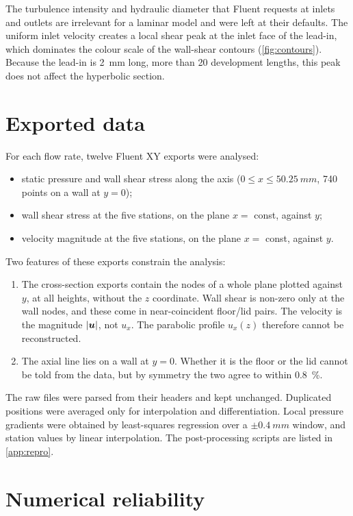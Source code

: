 The turbulence intensity and hydraulic diameter that Fluent requests at inlets and outlets are irrelevant for a laminar model and were left at their defaults. The uniform inlet velocity creates a local shear peak at the inlet face of the lead-in, which dominates the colour scale of the wall-shear contours (\cref{fig:contours}). Because the lead-in is \SI{2}{mm} long, more than 20 development lengths, this peak does not affect the hyperbolic section.

\section{Exported data}
\label{sec:num_exports}

For each flow rate, twelve Fluent XY exports were analysed:
\begin{itemize}
\item static pressure and wall shear stress along the axis ($0\le x\le\SI{50.25}{mm}$, 740 points on a wall at $y=0$);
\item wall shear stress at the five stations, on the plane $x=$ const, against $y$;
\item velocity magnitude at the five stations, on the plane $x=$ const, against $y$.
\end{itemize}
Two features of these exports constrain the analysis:
\begin{enumerate}
\item The cross-section exports contain the nodes of a whole plane plotted against $y$, at all heights, without the $z$ coordinate. Wall shear is non-zero only at the wall nodes, and these come in near-coincident floor/lid pairs. The velocity is the magnitude $|\bm{u}|$, not $u_x$. The parabolic profile $u_x(z)$ therefore cannot be reconstructed.
\item The axial line lies on a wall at $y=0$. Whether it is the floor or the lid cannot be told from the data, but by symmetry the two agree to within \SI{0.8}{\percent}.
\end{enumerate}
The raw files were parsed from their headers and kept unchanged. Duplicated positions were averaged only for interpolation and differentiation. Local pressure gradients were obtained by least-squares regression over a $\pm\SI{0.4}{mm}$ window, and station values by linear interpolation. The post-processing scripts are listed in \cref{app:repro}.

\section{Numerical reliability}

